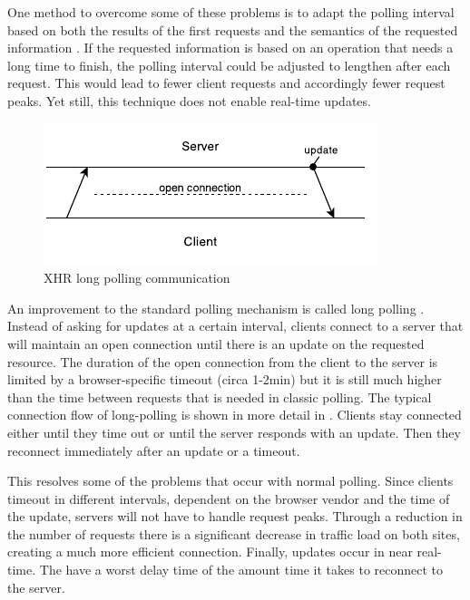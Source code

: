One method to overcome some of these problems is to adapt the polling interval based on both the results of the first requests and the semantics of the requested information \cite{wanstrath2009pollinginterval}. If the requested information is based on an operation that needs a long time to finish, the polling interval could be adjusted to lengthen after each request. This would lead to fewer client requests and accordingly fewer request peaks. Yet still, this technique does not enable real-time updates.

\begin{figure}[htb]
  \centerline{\includegraphics[width=0.8\linewidth]{images/Long_Polling.pdf}}
  \caption[XHR long polling communication]{XHR long polling communication}
  \label{fig:longpolling}
\end{figure}

An improvement to the standard polling mechanism is called long polling \cite[p. 276]{grigorik2013high}. Instead of asking for updates at a certain interval, clients connect to a server that will maintain an open connection until there is an update on the requested resource. The duration of the open connection from the client to the server is limited by a browser-specific timeout (circa 1-2min) but it is still much higher than the time between requests that is needed in classic polling. The typical connection flow of long-polling is shown in more detail in . Clients stay connected either until they time out or until the server responds with an update. Then they reconnect immediately after an update or a timeout.

This resolves some of the problems that occur with normal polling. Since clients timeout in different intervals, dependent on the browser vendor and the time of the update, servers will not have to handle request peaks. Through a reduction in the number of requests there is a significant decrease in traffic load on both sites, creating a much more efficient connection. Finally, updates occur in near real-time. The have a worst delay time of the amount time it takes to reconnect to the server.